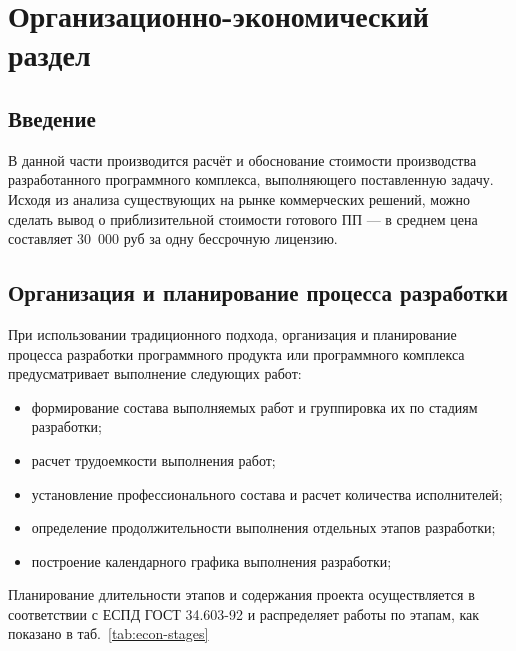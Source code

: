 \section{Организационно-экономический раздел}
\subsection{Введение}
В данной части производится расчёт и обоснование стоимости производства разработанного программного комплекса, выполняющего поставленную задачу.
Исходя из анализа существующих на рынке коммерческих решений, можно сделать вывод о приблизительной стоимости готового ПП --- в среднем цена составляет 30~000 руб за одну бессрочную лицензию.

\subsection{Организация и планирование процесса разработки}
При использовании традиционного подхода, организация и планирование процесса разработки программного продукта или программного комплекса предусматривает выполнение следующих работ:

\begin{itemize}
\item формирование состава выполняемых работ и группировка их по стадиям разработки;
\item расчет трудоемкости выполнения работ;
\item установление профессионального состава и расчет количества исполнителей;
\item определение продолжительности выполнения отдельных этапов разработки;
\item построение календарного графика выполнения разработки;
\end{itemize}

Планирование длительности этапов и содержания проекта осуществляется в соответствии с ЕСПД ГОСТ 34.603-92 и распределяет работы по этапам, как показано в таб.~\ref{tab:econ-stages}


